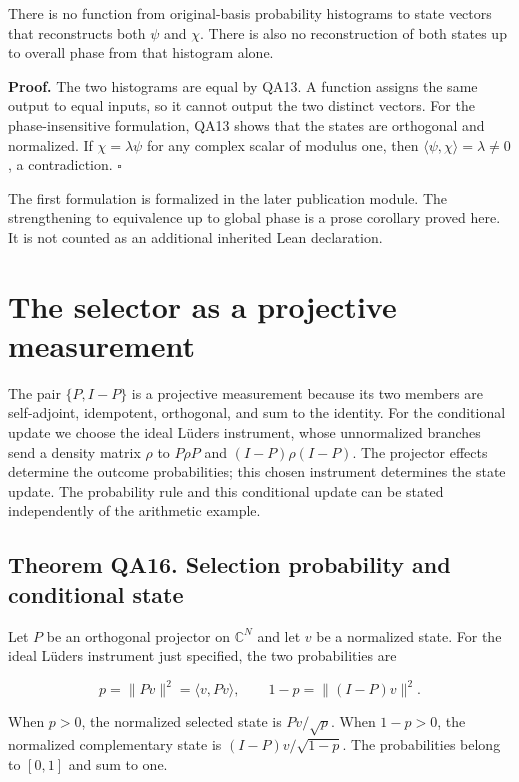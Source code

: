 There is no function from original-basis probability histograms to state
vectors that reconstructs both \(\psi\) and \(\chi\). There is also no
reconstruction of both states up to overall phase from that histogram
alone.

\textbf{Proof.} The two histograms are equal by QA13. A function assigns
the same output to equal inputs, so it cannot output the two distinct
vectors. For the phase-insensitive formulation, QA13 shows that the
states are orthogonal and normalized. If \(\chi=\lambda\psi\) for any
complex scalar of modulus one, then
\(\langle\psi,\chi\rangle=\lambda\ne0\), a contradiction. \(\square\)

The first formulation is formalized in the later publication module. The
strengthening to equivalence up to global phase is a prose corollary
proved here. It is not counted as an additional inherited Lean
declaration.

\hypertarget{the-selector-as-a-projective-measurement}{%
\section{The selector as a projective
measurement}\label{the-selector-as-a-projective-measurement}}

The pair \(\{P,I-P\}\) is a projective measurement because its two
members are self-adjoint, idempotent, orthogonal, and sum to the
identity. For the conditional update we choose the ideal Lüders
instrument, whose unnormalized branches send a density matrix \(\rho\)
to \(P\rho P\) and \((I-P)\rho(I-P)\). The projector effects determine
the outcome probabilities; this chosen instrument determines the state
update. The probability rule and this conditional update can be stated
independently of the arithmetic example.

\hypertarget{theorem-qa16.-selection-probability-and-conditional-state}{%
\subsection*{Theorem QA16. Selection probability and conditional
state}\label{theorem-qa16.-selection-probability-and-conditional-state}}

Let \(P\) be an orthogonal projector on \(\mathbb C^N\) and let \(v\) be
a normalized state. For the ideal Lüders instrument just specified, the
two probabilities are

\[
p=\|Pv\|^2=\langle v,Pv\rangle,
\qquad 1-p=\|(I-P)v\|^2.
\]

When \(p>0\), the normalized selected state is \(Pv/\sqrt p\). When
\(1-p>0\), the normalized complementary state is \((I-P)v/\sqrt{1-p}\).
The probabilities belong to \([0,1]\) and sum to one.


